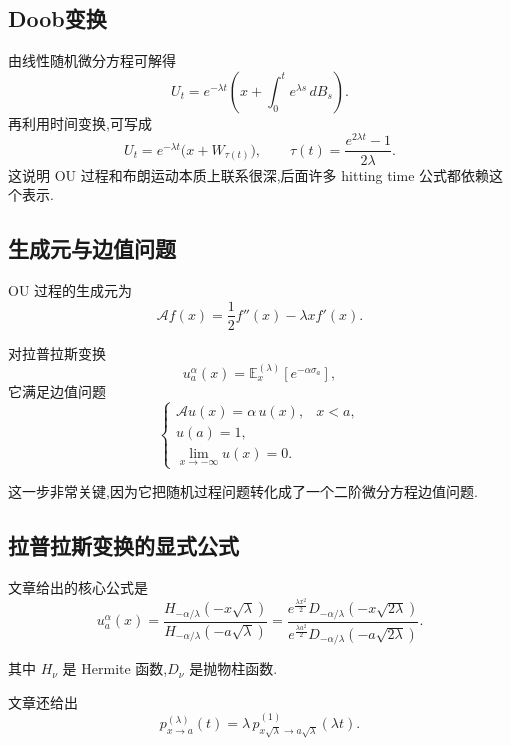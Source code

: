 \documentclass[oneside]{ctexart}
\begin{document}
\subsection{Doob变换}
由线性随机微分方程可解得
\[
    U_t=e^{-\lambda t}\left(x+\int_0^t e^{\lambda s}\,dB_s\right).
\]
再利用时间变换,可写成
\begin{equation}\label{eq:doob}
    U_t=e^{-\lambda t}\bigl(x+W_{\tau(t)}\bigr),\qquad
    \tau(t)=\frac{e^{2\lambda t}-1}{2\lambda}.
\end{equation}
这说明 OU 过程和布朗运动本质上联系很深,后面许多 hitting time 公式都依赖这个表示.

\subsection{生成元与边值问题}

OU 过程的生成元为
\[
    \mathcal{A}f(x)=\frac12 f''(x)-\lambda x f'(x).
\]

对拉普拉斯变换
\[
    u_{a}^{\alpha}(x)=\mathbb{E}_x^{(\lambda)}[e^{-\alpha\sigma_a}],
\]
它满足边值问题
\begin{equation}\label{eq:sl}
    \begin{cases}
        \mathcal{A}u(x)=\alpha\,u(x), & x<a, \\
        u(a)=1,                              \\
        \lim\limits_{x\to-\infty}u(x)=0.
    \end{cases}
\end{equation}

这一步非常关键,因为它把随机过程问题转化成了一个二阶微分方程边值问题.

\subsection{拉普拉斯变换的显式公式}

文章给出的核心公式是
\begin{equation}\label{eq:laplace}
    u_{a}^{\alpha}(x)
    =
    \frac{H_{-\alpha/\lambda}(-x\sqrt{\lambda})}
    {H_{-\alpha/\lambda}(-a\sqrt{\lambda})}
    =
    \frac{e^{\tfrac{\lambda x^2}{2}}D_{-\alpha/\lambda}(-x\sqrt{2\lambda})}
    {e^{\tfrac{\lambda a^2}{2}}D_{-\alpha/\lambda}(-a\sqrt{2\lambda})}.
\end{equation}

其中 $H_\nu$ 是 Hermite 函数,$D_\nu$ 是抛物柱函数.

文章还给出
\begin{equation}\label{eq:scaling}
    p_{x\to a}^{(\lambda)}(t)
    =
    \lambda\,p_{x\sqrt{\lambda}\to a\sqrt{\lambda}}^{(1)}(\lambda t).
\end{equation}
\end{document}
